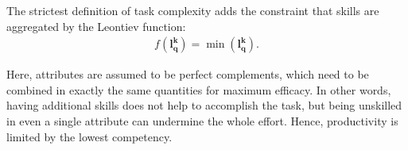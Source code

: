 {\begin{definition}
\begin{subdefinition}
        \end{subdefinition}
        
        \begin{subdefinition}
            The strictest definition of task complexity adds the constraint that skills are aggregated by the Leontiev function:
            \begin{gather}
                f(\boldsymbol{l_{q}^{k}}) = 
                \min(\boldsymbol{l_{q}^{k}})
                .
            \end{gather}

            Here, attributes are assumed to be perfect complements, which need to be combined in exactly the same quantities for maximum efficacy. In other words, having additional skills does not help to accomplish the task, but being unskilled in even a single attribute can undermine the whole effort. Hence, productivity is limited by the lowest competency.
        \end{subdefinition}

    \end{definition}
}


\newcommand{\SCL}{
    \label{scl}

    \begin{lemma}[Skill Composition Lemma]
        The Skill Composition Lemma (SCL) is a generalization of the SSL and states that skills are composable to accomplish complex tasks. More precisely, let $T_{q}^{l}$ be an activity of difficulty level $l$ that requires the $\boldsymbol{a_q} = (a_{1}^{q}, \dots, a_{m}^{q})$ skill set (i.e. $T_{q}^{l}$ is a complex task). With this, we demonstrate that any rational and sufficiently qualified economic agent can naturally ``piece together'', that is \textit{compose}, attributes $\{1, \dots, m\}$ to accomplish the $T_{q}^{l}$ complex task.
        
        \begin{proof}
            Given 
            \begin{gather}
                \tilde{T}_{q}^{k} = 
                \int_{0}^{1}{
                    T(l, l_{q}^{k})
                    dl
                }
            \end{gather}
        \end{proof}
    \end{lemma}
}

